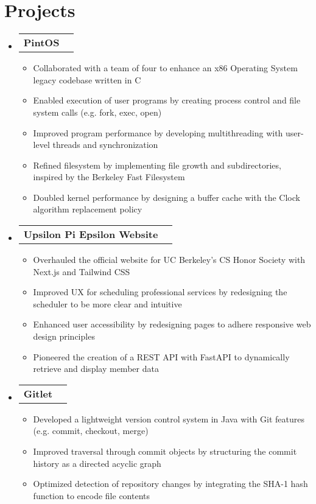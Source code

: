\documentclass[letterpaper,11pt]{article}
\makeatletter
\newcommand{\resumeItem}[1]{
  \item\small{
    {#1 \vspace{-2pt}}
  }
}
\newcommand{\resumeProjectHeading}[2]{
    \item
    \begin{tabular*}{0.97\textwidth}{l@{\extracolsep{\fill}}r}
      \small#1 & #2 \\
    \end{tabular*}\vspace{-7pt}
}
\newcommand{\resumeSubHeadingListStart}{\begin{itemize}[leftmargin=0.15in, label={}]}
\newcommand{\resumeSubHeadingListEnd}{\end{itemize}}
\newcommand{\resumeItemListStart}{\begin{itemize}}
\newcommand{\resumeItemListEnd}{\end{itemize}\vspace{-5pt}}
\makeatother
\begin{document}
\section{\textbf{Projects}}
    \resumeSubHeadingListStart
      \resumeProjectHeading
          {\textbf{PintOS}}{\href{https://gitfront.io/r/huytt621/6546c41e067e9f94621b90d764d7d16da3abb527/gitlet/}{}}
          \resumeItemListStart
            \resumeItem{Collaborated with a team of four to enhance an x86 Operating System legacy codebase written in C}
            \resumeItem{Enabled execution of user programs by creating process control and file system calls (e.g. fork, exec, open)}
            \resumeItem{Improved program performance by developing multithreading with user-level threads and synchronization}
            \resumeItem{Refined filesystem by implementing file growth and subdirectories, inspired by the Berkeley Fast Filesystem}
            \resumeItem{Doubled kernel performance by designing a buffer cache with the Clock algorithm replacement policy}
          \resumeItemListEnd
      \resumeProjectHeading
          {\textbf{Upsilon Pi Epsilon Website}}{\href{https://github.com/upenu}{}}
          \resumeItemListStart
            \resumeItem{Overhauled the official website for UC Berkeley's CS Honor Society with Next.js and Tailwind CSS}
            \resumeItem{Improved UX for scheduling professional services by redesigning the scheduler to be more clear and intuitive}
            \resumeItem{Enhanced user accessibility by redesigning pages to adhere responsive web design principles}
            \resumeItem{Pioneered the creation of a REST API with FastAPI to dynamically retrieve and display member data}
          \resumeItemListEnd
      \resumeProjectHeading
          {\textbf{Gitlet}}{\href{https://gitfront.io/r/huytt621/6546c41e067e9f94621b90d764d7d16da3abb527/gitlet/}{}}
          \resumeItemListStart
            \resumeItem{Developed a lightweight version control system in Java with Git features (e.g. commit, checkout, merge)}
            \resumeItem{Improved traversal through commit objects by structuring the commit history as a directed acyclic graph}
            \resumeItem{Optimized detection of repository changes by integrating the SHA-1 hash function to encode file contents}
          \resumeItemListEnd
    \resumeSubHeadingListEnd


\end{document}
